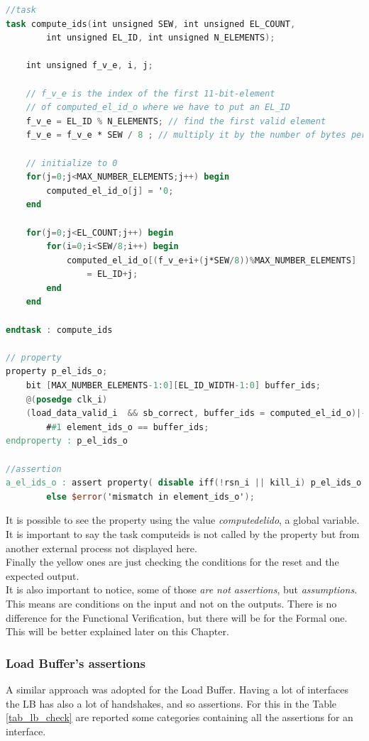 \begin{lstlisting}[language=Verilog,style=verilog-style, backgroundcolor=\color{lyel_palette}, frame=tlb]
//task
task compute_ids(int unsigned SEW, int unsigned EL_COUNT, 
	    int unsigned EL_ID, int unsigned N_ELEMENTS);

    int unsigned f_v_e, i, j;
		
    // f_v_e is the index of the first 11-bit-element 
    // of computed_el_id_o where we have to put an EL_ID
	f_v_e = EL_ID % N_ELEMENTS; // find the first valid element 
	f_v_e = f_v_e * SEW / 8 ; // multiply it by the number of bytes per el
		
	// initialize to 0
	for(j=0;j<MAX_NUMBER_ELEMENTS;j++) begin
	    computed_el_id_o[j] = '0;
	end

	for(j=0;j<EL_COUNT;j++) begin
		for(i=0;i<SEW/8;i++) begin
			computed_el_id_o[(f_v_e+i+(j*SEW/8))%MAX_NUMBER_ELEMENTS] 
			    = EL_ID+j;
		end
	end

endtask : compute_ids

// property
property p_el_ids_o;
	bit [MAX_NUMBER_ELEMENTS-1:0][EL_ID_WIDTH-1:0] buffer_ids;
	@(posedge clk_i)
	(load_data_valid_i  && sb_correct, buffer_ids = computed_el_id_o)|-> 
        ##1 element_ids_o == buffer_ids;
endproperty : p_el_ids_o

//assertion
a_el_ids_o : assert property( disable iff(!rsn_i || kill_i) p_el_ids_o ) 
        else $error('mismatch in element_ids_o');
\end{lstlisting}
\bigskip

It is possible to see the property using the value \textit{computed\+el\+id\+o}, a global variable. It is important to say the task compute\+ids is not called by the property but from another external process not displayed here.\\

Finally the yellow ones are just checking the conditions for the reset and the expected output.\\

It is also important to notice, some of those \textit{are not assertions}, but \textit{assumptions}. This means are conditions on the input and not on the outputs. There is no difference for the Functional Verification, but there will be for the Formal one. This will be better explained later on this Chapter.\\



\subsubsection{Load Buffer's assertions}
A similar approach was adopted for the Load Buffer. Having a lot of interfaces the LB has also a lot of handshakes, and so assertions. For this in the Table \ref{tab_lb_check} are reported some categories containing all the assertions for an interface.\\

